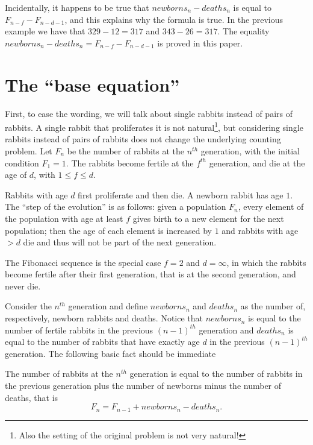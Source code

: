 \documentclass[11pt,epsf]{article}
\begin{document}
Incidentally, it happens to be true that  $newborns_n-deaths_n$ is equal to $F_{n-f}-F_{n-d-1}$, and this explains why the formula is true.
In the previous example we have that $329-12=317$ and $343-26=317$.
The equality $newborns_n-deaths_n=F_{n-f}-F_{n-d-1}$ is proved in this paper.


\section{The ``base equation''}

First, to ease the wording, we will talk about single rabbits instead of pairs of rabbits. A single rabbit
that proliferates it is not natural\footnote{Also the setting of the original problem is not very natural!}, but considering single rabbits instead of pairs
of rabbits does not change the underlying counting problem.
Let $F_n$ be the number of rabbits at the $n^{th}$ generation, with the initial condition $F_1=1$.
The rabbits become fertile at the $f^{th}$ generation, and die at the age of $d$, with $1\le f \le d$.

Rabbits with age $d$ first proliferate and then die. A newborn rabbit has age $1$. 
The ``step of the evolution''
is as follows: given a population $F_n$, every element of the population with age at least $f$
gives birth to a new element for the next population; then the age of each element is increased by $1$
and rabbits with age $>d$ die and thus will not be part of the next generation.

The Fibonacci sequence is the special case $f=2$ and $d=\infty$, in which the rabbits become fertile
after their first generation, that is at the second generation, and never die.

Consider the $n^{th}$ generation and define $newborns_n$ and $deaths_n$ as the number of,
respectively, newborn rabbits and deaths. Notice that $newborns_n$ is equal to the number
of fertile rabbits in the previous $(n-1)^{th}$ generation and
$deaths_n$ is equal to the number of rabbits that have exactly age $d$ in the
previous $(n-1)^{th}$ generation.
The following basic fact should be immediate

\bigskip

The number of rabbits at the $n^{th}$ generation is equal to the number of rabbits in the previous
generation plus the number of newborns minus the number of deaths, that is
\begin{equation}\label{eq:base}
F_n=F_{n-1} + newborns_{n} - deaths_{n}.
\end{equation}
\end{document}
